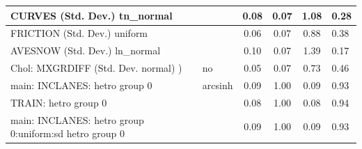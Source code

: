 \begin{table}
\begin{center}
\begin{tabular}{|l|l|c|c|c|l|}
			\hline
			CURVES (Std. Dev.) tn_normal &  & 0.08 & 0.07 & 1.08 & 0.28 \\
			\hline
			FRICTION (Std. Dev.) uniform &  & 0.06 & 0.07 & 0.88 & 0.38 \\
			\hline
			AVESNOW (Std. Dev.) ln_normal &  & 0.10 & 0.07 & 1.39 & 0.17 \\
			\hline
			 Chol: MXGRDIFF (Std. Dev. normal) ) & no & 0.05 & 0.07 & 0.73 & 0.46 \\
			\hline
			main: INCLANES: hetro group 0 & arcsinh & 0.09 & 1.00 & 0.09 & 0.93 \\
			\hline
			TRAIN: hetro group 0 &  & 0.08 & 1.00 & 0.08 & 0.94 \\
			\hline
			main: INCLANES: hetro group 0:uniform:sd  hetro group 0 &  & 0.09 & 1.00 & 0.09 & 0.93 \\
			\hline
		\end{tabular}
	\end{center}
\end{table}